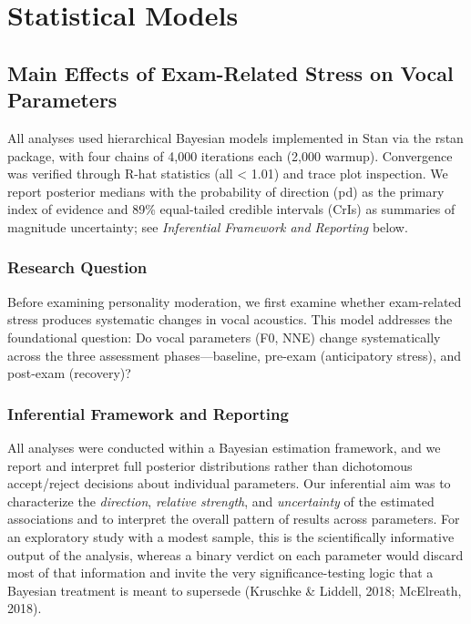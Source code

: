 \documentclass[
  english,
  man,floatsintext]{apa6}
\begin{document}
\newpage

\section{Statistical Models}\label{statistical-models}

\subsection{Main Effects of Exam-Related Stress on Vocal Parameters}\label{main-effects-of-exam-related-stress-on-vocal-parameters}

All analyses used hierarchical Bayesian models implemented in Stan via the rstan package, with four chains of 4,000 iterations each (2,000 warmup). Convergence was verified through R-hat statistics (all \textless{} 1.01) and trace plot inspection. We report posterior medians with the probability of direction (pd) as the primary index of evidence and 89\% equal-tailed credible intervals (CrIs) as summaries of magnitude uncertainty; see \emph{Inferential Framework and Reporting} below.

\subsubsection{Research Question}\label{research-question}

Before examining personality moderation, we first examine whether exam-related stress produces systematic changes in vocal acoustics. This model addresses the foundational question: Do vocal parameters (F0, NNE) change systematically across the three assessment phases---baseline, pre-exam (anticipatory stress), and post-exam (recovery)?

\subsubsection{Inferential Framework and Reporting}\label{inferential-framework-and-reporting}

All analyses were conducted within a Bayesian estimation framework, and we report and
interpret full posterior distributions rather than dichotomous accept/reject decisions
about individual parameters. Our inferential aim was to characterize the \emph{direction},
\emph{relative strength}, and \emph{uncertainty} of the estimated associations and to interpret the
overall pattern of results across parameters. For an exploratory study with a modest
sample, this is the scientifically informative output of the analysis, whereas a binary
verdict on each parameter would discard most of that information and invite the very
significance-testing logic that a Bayesian treatment is meant to supersede
(Kruschke \& Liddell, 2018; McElreath, 2018).
\end{document}
